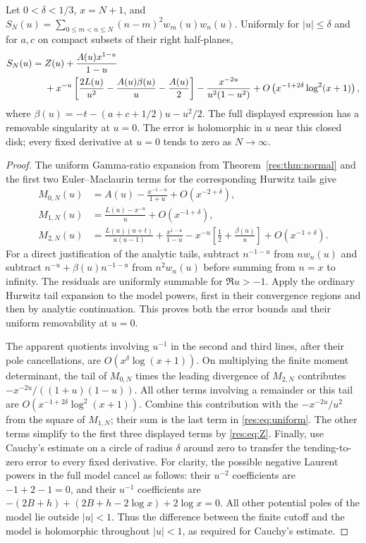 \begin{theorem}
\label{res:thm:uniform}
Let $0<\delta<1/3$, $x=N+1$, and
$S_N(u)=\sum_{0\leq m<n\leq N}(n-m)^2w_m(u)w_n(u)$.
Uniformly for $|u|\leq\delta$ and for $a,c$ on compact subsets of
their right half-planes,
\begin{align}
 S_N(u)={}&Z(u)+\frac{A(u)x^{1-u}}{1-u}\notag\\
 &+x^{-u}\left[\frac{2L(u)}{u^2}
              -\frac{A(u)\beta(u)}u-\frac{A(u)}2\right]
       -\frac{x^{-2u}}{u^2(1-u^2)}
       +O\left(x^{-1+2\delta}\log^2(x+1)\right),
 \label{res:eq:uniform}
\end{align}
where $\beta(u)=-t-(a+c+1/2)u-u^2/2$.
The full displayed expression has a removable singularity at $u=0$.
The error is holomorphic in $u$ near this closed disk; every fixed
derivative at $u=0$ tends to zero as $N\to\infty$.
\end{theorem}
\begin{proof}
The uniform Gamma-ratio expansion from
Theorem~\ref{res:thm:normal} and the first two Euler--Maclaurin
terms for the corresponding Hurwitz tails
\cite[Equation 25.11.43]{DLMF} give
\begin{align*}
 M_{0,N}(u)&=A(u)-\frac{x^{-1-u}}{1+u}
                   +O(x^{-2+\delta}),\\
 M_{1,N}(u)&=\frac{L(u)-x^{-u}}u+O(x^{-1+\delta}),\\
 M_{2,N}(u)&=\frac{L(u)(u+t)}{u(u-1)}
       +\frac{x^{1-u}}{1-u}
       -x^{-u}\left[\frac12+\frac{\beta(u)}u\right]
       +O(x^{-1+\delta}).
\end{align*}
For a direct justification of the analytic tails, subtract
$n^{-1-u}$ from $nw_n(u)$ and subtract
$n^{-u}+\beta(u)n^{-1-u}$ from $n^2w_n(u)$ before summing from
$n=x$ to infinity.  The residuals are uniformly summable for
$\Re u>-1$.  Apply the ordinary Hurwitz tail expansion to the
model powers, first in their convergence regions and then by
analytic continuation.  This proves both the error bounds and
their uniform removability at $u=0$.

The apparent quotients involving $u^{-1}$ in the second and third
lines, after their pole cancellations, are
$O(x^\delta\log(x+1))$.  On multiplying the finite moment
determinant, the tail of $M_{0,N}$ times the leading divergence of
$M_{2,N}$ contributes
$-x^{-2u}/((1+u)(1-u))$.  All other terms involving a remainder
or this tail are $O(x^{-1+2\delta}\log^2(x+1))$.
Combine this contribution with the $-x^{-2u}/u^2$ from the square
of $M_{1,N}$; their sum is the last term in
\eqref{res:eq:uniform}.  The other terms simplify to the first
three displayed terms by \eqref{res:eq:Z}.
Finally, use Cauchy's estimate on a circle of radius $\delta$
around zero to transfer the tending-to-zero error to every fixed
derivative.  For clarity, the possible negative Laurent powers in
the full model cancel as follows: their $u^{-2}$ coefficients are
$-1+2-1=0$, and their $u^{-1}$ coefficients are
$-(2B+h)+(2B+h-2\log x)+2\log x=0$.
All other potential poles of the model lie outside $|u|<1$.
Thus the difference between the finite cutoff and the model is
holomorphic throughout $|u|<1$, as required for Cauchy's estimate.
\end{proof}


